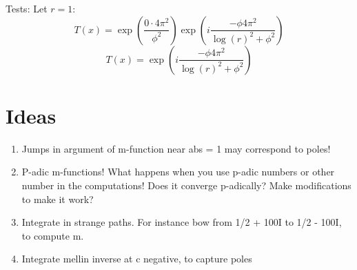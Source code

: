 \documentclass[a4paper]{amsart}
\begin{document}
Tests:
Let $r = 1$:
$$T(x) = \exp(\frac{0\cdot 4\pi^2}{\phi^2}) \exp(i\frac{-\phi4\pi^2}{\log(r)^2 + \phi^2})$$
$$T(x) = \exp(i\frac{-\phi4\pi^2}{\log(r)^2 + \phi^2})$$

\section{Ideas}

\begin{enumerate}
  \item Jumps in argument of m-function near abs = 1 may correspond to poles!
  \item P-adic m-functions! What happens when you use p-adic numbers or other number in the computations! Does it converge p-adically? Make modifications to make it work?
  \item Integrate in strange paths. For instance bow from 1/2 + 100I to 1/2 - 100I, to compute m.
  \item Integrate mellin inverse at c negative, to capture poles
\end{enumerate}
\end{document}
